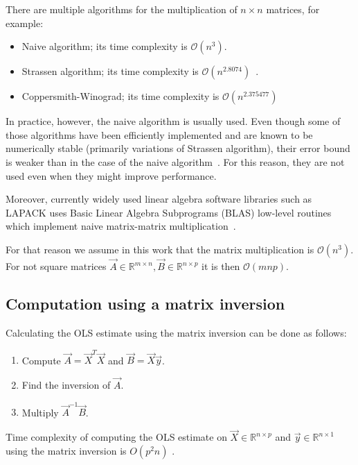 There are multiple algorithms for the multiplication of $n \times n$ matrices, for example:
\begin{itemize}
  \item Naive algorithm; its time complexity is $\mathcal{O}(n^{3})$.
  \item Strassen algorithm; its time complexity is $\mathcal{O} (n^{2.8074})$~\cite{strassen1969gaussian}. 
  \item Coppersmith-Winograd; its time complexity is $\mathcal {O}(n^{2.375477})$~\cite{coppersmith1990matrix}
\end{itemize}

In practice, however, the naive algorithm is usually used. Even though some of those algorithms have been efficiently implemented and are known to be numerically stable (primarily variations of Strassen algorithm), their error bound is weaker than in the case of the naive algorithm~\cite{ballard2015improving}. For this reason, they are not used even when they might improve performance.

Moreover, currently widely used linear algebra software libraries such as LAPACK uses Basic Linear Algebra Subprograms (BLAS) low-level routines which implement naive matrix-matrix multiplication~\cite{laug}.

For that reason we assume in this work that the matrix multiplication is  $\mathcal{O}(n^{3})$. For not square matrices $ \vec{A} \in \mathbb{R}^{m \times n}, \vec{B} \in \mathbb{R}^{n\times p}$ it is then $\mathcal{O}(mnp)$.



\subsection{Computation using a matrix inversion}
Calculating the OLS estimate using the matrix inversion can be done as follows:

\begin{enumerate}
 \item Compute  $\vec{A} = \vec{X}^T\vec{X}$ and $\vec{B} = \vec{X}\vec{y}$.
  \item Find the inversion of $\vec{A}$.
  \item Multiply $\vec{A}^{-1}\vec{B}$.
\end{enumerate}

\begin{observation} \label{time:complexity:ols:inversion}
    Time complexity of computing the OLS  estimate on $\vec{X} \in \mathbb{R}^{n \times p}$ and $\vec{y}  \in \mathbb{R}^{n \times 1}$ using the matrix inversion is $O(p^2n)$ .
\end{observation}

